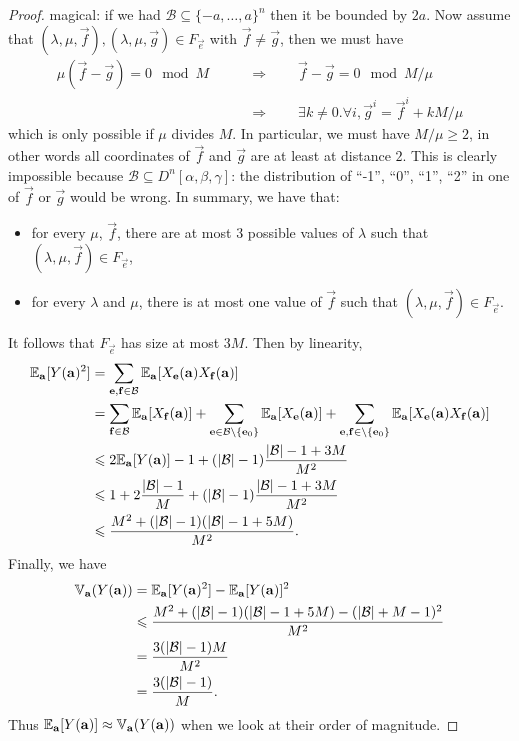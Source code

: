 \begin{proof}
magical: if we had $\mathcal{B}\subseteq\{-a,\ldots,a\}^n$ then it be
bounded by $2a$. Now assume that
$(\lambda,\mu,\vec{f}),(\lambda,\mu,\vec{g})\in F_{\vec{e}}$
with $\vec{f}\neq\vec{g}$, then we must have
\begin{align*}
	\mu(\vec{f}-\vec{g})=0\mod M
	&\qquad\Rightarrow\qquad \vec{f}-\vec{g}=0\mod M/\mu\\
	&\qquad\Rightarrow\qquad\exists k\neq 0.
		\forall i, \vec{g}^i=\vec{f}^i+kM/\mu
\end{align*}
which is only possible if $\mu$ divides $M$. In particular, we must have
$M/\mu\geqslant2$, in other words all coordinates of $\vec{f}$
and $\vec{g}$ are at least at distance $2$. This is clearly impossible because $\mathcal{B}\subseteq D^n[\alpha,\beta,\gamma]$:
the distribution of ``-1'', ``0'', ``1'', ``2'' in one of $\vec{f}$ or
$\vec{g}$ would be wrong. In summary, we have that:
\begin{itemize}
	\item for every $\mu$, $\vec{f}$, there are at most
		3 possible values of $\lambda$ such that
		$(\lambda,\mu,\vec{f})\in F_{\vec{e}}$,
	\item for every $\lambda$ and $\mu$, there is at most one value
		of $\vec{f}$ such that $(\lambda,\mu,\vec{f})\in F_{\vec{e}}$.
\end{itemize}
It follows that $F_{\vec{e}}$ has size at most $3M$.
Then by linearity,
\begin{align*}
	\mathbb{E}_{\mathbf{a}}[Y(\mathbf{a})^2]
		&=\sum_{\mathbf{e},\mathbf{f}\in\mathcal{B}}\mathbb{E}_{\mathbf{a}}[
			X_{\mathbf{e}}(\mathbf{a})X_{\mathbf{f}}(\mathbf{a})]\\
		&=\sum_{\mathbf{f}\in\mathcal{B}}
			\mathbb{E}_{\mathbf{a}}[X_{\mathbf{f}}(\mathbf{a})]
			+\sum_{\mathbf{e}\in\mathcal{B}\setminus\{\mathbf{e}_0\}}
			\mathbb{E}_{\mathbf{a}}[X_{\mathbf{e}}(\mathbf{a})]
			+\sum_{\mathbf{e},\mathbf{f}\in\setminus\{\mathbf{e}_0\}}\mathbb{E}_{\mathbf{a}}[
			X_{\mathbf{e}}(\mathbf{a})X_{\mathbf{f}}(\mathbf{a})]\\
		&\leqslant2\mathbb{E}_{\mathbf{a}}[Y(\mathbf{a})]-1
			+(|\mathcal{B}|-1)\frac{|\mathcal{B}|-1+3M}{M^2}\\
		&\leqslant1+2\frac{|\mathcal{B}|-1}{M}
			+(|\mathcal{B}|-1)\frac{|\mathcal{B}|-1+3M}{M^2}\\
		&\leqslant
			\frac{M^2+(|\mathcal{B}|-1)(|\mathcal{B}|-1+5M)}{M^2}.
\end{align*}
Finally, we have
\begin{align*}
        \mathbb{V}_{\mathbf{a}}(Y(\mathbf{a}))
            &=\mathbb{E}_{\mathbf{a}}[Y(\mathbf{a})^2]-\mathbb{E}_{\mathbf{a}}[Y(\mathbf{a})]^2\\
            &\leqslant\frac{M^2+(|\mathcal{B}|-1)(|\mathcal{B}|-1+5M)
            	-(|\mathcal{B}|+M-1)^2}{M^2}\\
		&=\frac{3(|\mathcal{B}|-1)M}{M^2}\\
		&=\frac{3(|\mathcal{B}|-1)}{M}.
\end{align*}
Thus $\mathbb{E}_{\mathbf{a}}[Y(\mathbf{a})]\approx \mathbb{V}_{\mathbf{a}}(Y(\mathbf{a}))$ when we look at their order of magnitude.


\end{proof}
